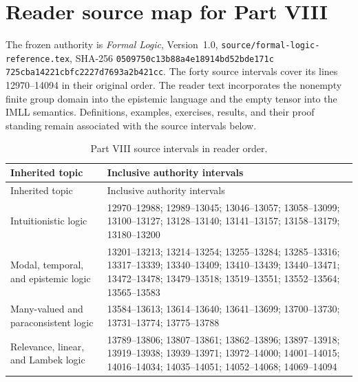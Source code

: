 \section*{Reader source map for Part VIII}
\label{sec:p08-source-map}

The frozen authority is \emph{Formal Logic}, Version~1.0,
\texttt{source/formal-logic-reference.tex}, SHA-256
\texttt{0509750c13b88a4e\allowbreak18914bd52bde171c\allowbreak
725cba14221cbfc2\allowbreak227d7693a2b421cc}.
The forty source intervals cover its lines 12970--14094 in their original
order.  The reader text incorporates the nonempty finite group domain into
the epistemic language and the empty tensor into the IMLL semantics.
Definitions, examples, exercises, results, and their proof standing remain
associated with the source intervals below.

\begin{longtable}{@{}p{}p{}@{}}
\caption{Part VIII source intervals in reader order.}
\label{tab:p08-source-intervals}\\
\toprule
Inherited topic & Inclusive authority intervals \\
\midrule
\endfirsthead
\toprule
Inherited topic & Inclusive authority intervals \\
\midrule
\endhead
Intuitionistic logic &
12970--12988; 12989--13045; 13046--13057; 13058--13099;
13100--13127; 13128--13140; 13141--13157; 13158--13179;
13180--13200 \\
Modal, temporal, and epistemic logic &
13201--13213; 13214--13254; 13255--13284; 13285--13316;
13317--13339; 13340--13409; 13410--13439; 13440--13471;
13472--13478; 13479--13518; 13519--13551; 13552--13564;
13565--13583 \\
Many-valued and paraconsistent logic &
13584--13613; 13614--13640; 13641--13699; 13700--13730;
13731--13774; 13775--13788 \\
Relevance, linear, and Lambek logic &
13789--13806; 13807--13861; 13862--13896; 13897--13918;
13919--13938; 13939--13971; 13972--14000; 14001--14015;
14016--14034; 14035--14051; 14052--14068; 14069--14094 \\
\bottomrule
\end{longtable}

